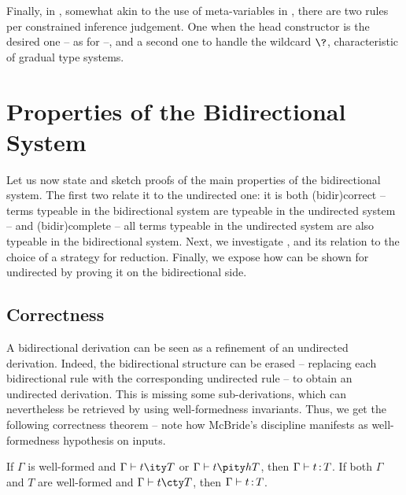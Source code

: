 Finally, in , somewhat akin to the use of meta-variables in
\textcite{Asperti2012}, there are two rules per constrained inference judgement.
One when the head constructor is the desired one – as for  –,
and a second one to handle the wildcard $\?$, characteristic of gradual type systems.


\section{Properties of the Bidirectional System}
\label{sec:bidir-prop}

Let us now state and sketch proofs of the main properties of the bidirectional system.
The first two relate it to the
undirected one: it is both \kl(bidir){correct} – terms typeable in the bidirectional system are typeable in the undirected system – and \kl(bidir){complete} – all terms typeable in the undirected system are also typeable in the bidirectional system.
Next, we investigate , and its relation to the choice of a strategy for reduction.
Finally, we expose how  can be shown for undirected 
by proving it on the bidirectional side.

\subsection{Correctness}

A bidirectional derivation can be seen as a refinement of an undirected derivation.
Indeed, the bidirectional structure can be erased
– replacing each bidirectional rule with the corresponding undirected rule – to obtain an undirected derivation. This is missing some sub-derivations,
which can nevertheless be retrieved by using well-formedness invariants.
Thus, we get the following correctness theorem – note how McBride’s discipline manifests as well-formedness hypothesis on inputs.

\begin{theorem}
  \label{thm:corr-ccomega}
  If $\Gamma$ is well-formed and $\inferty{\Gamma}{t}{T}$ or $\pinferty{h}{\Gamma}{t}{T}$,
  then $\Gamma \vdash t \operatorname{\mathrel{:}} T$.
  If both $\Gamma$ and $T$ are well-formed and
  $\checkty{\Gamma}{t}{T}$, then $\Gamma \vdash t \operatorname{\mathrel{:}} T$. 
\end{theorem}
  
